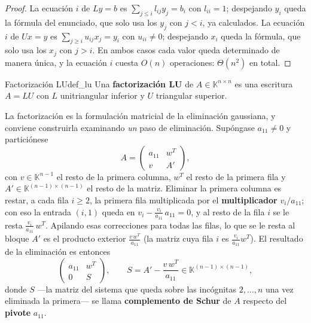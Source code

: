 \documentclass[11pt, a4paper]{article}
\begin{document}
\begin{proof}
La ecuación $i$ de $Ly = b$ es $\sum_{j \le i} l_{ij} y_j = b_i$ con $l_{ii} = 1$; despejando $y_i$ queda la fórmula del enunciado, que solo usa los $y_j$ con $j < i$, ya calculados. La ecuación $i$ de $Ux = y$ es $\sum_{j \ge i} u_{ij} x_j = y_i$ con $u_{ii} \neq 0$; despejando $x_i$ queda la fórmula, que solo usa los $x_j$ con $j > i$. En ambos casos cada valor queda determinado de manera única, y la ecuación $i$ cuesta $O(n)$ operaciones: $\Theta(n^2)$ en total.
\end{proof}

\begin{definicion}{Factorización LU}{def_lu}
Una \textbf{factorización LU} de $A \in \mathbb{K}^{n \times n}$ es una escritura $A = LU$ con $L$ unitriangular inferior y $U$ triangular superior.
\end{definicion}

La factorización es la formulación matricial de la eliminación gaussiana, y conviene construirla examinando \emph{un} paso de eliminación. Supóngase $a_{11} \neq 0$ y particiónese
\[
A = \begin{pmatrix} a_{11} & w^T \\ v & A' \end{pmatrix},
\]
con $v \in \mathbb{K}^{n-1}$ el resto de la primera columna, $w^T$ el resto de la primera fila y $A' \in \mathbb{K}^{(n-1) \times (n-1)}$ el resto de la matriz. Eliminar la primera columna es restar, a cada fila $i \ge 2$, la primera fila multiplicada por el \textbf{multiplicador} $v_i / a_{11}$; con eso la entrada $(i,1)$ queda en $v_i - \frac{v_i}{a_{11}} \, a_{11} = 0$, y al resto de la fila $i$ se le resta $\frac{v_i}{a_{11}} \, w^T$. Apilando esas correcciones para todas las filas, lo que se le resta al bloque $A'$ es el producto exterior $\frac{v \, w^T}{a_{11}}$ (la matriz cuya fila $i$ es $\frac{v_i}{a_{11}} w^T$). El resultado de la eliminación es entonces
\[
\begin{pmatrix} a_{11} & w^T \\ 0 & S \end{pmatrix},
\qquad S = A' - \frac{v \, w^T}{a_{11}} \in \mathbb{K}^{(n-1) \times (n-1)},
\]
donde $S$ —la matriz del sistema que queda sobre las incógnitas $2, \dots, n$ una vez eliminada la primera— se llama \textbf{complemento de Schur} de $A$ respecto del \textbf{pivote} $a_{11}$.
\end{document}
